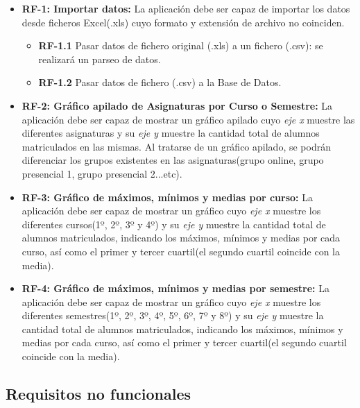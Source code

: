 \begin{itemize}
	\item \textbf{RF-1: Importar datos:} La aplicación debe ser capaz de importar los datos desde ficheros Excel(.xls) cuyo formato y extensión de archivo no coinciden.
	\begin{itemize}
		\item \textbf{RF-1.1} Pasar datos de fichero original (.xls) a un fichero (.csv): se realizará un parseo de datos.
		\item \textbf{RF-1.2} Pasar datos de fichero (.csv) a la Base de Datos.
	\end{itemize}
	
	\item \textbf{RF-2: Gráfico apilado de Asignaturas por Curso o Semestre:} La aplicación debe ser capaz de mostrar un gráfico apilado cuyo \emph{eje x} muestre las diferentes asignaturas y su \emph{eje y} muestre la cantidad total de alumnos matriculados en las mismas. Al tratarse de un gráfico apilado, se podrán diferenciar los grupos existentes en las asignaturas(grupo online, grupo presencial 1, grupo presencial 2...etc).
	
	\item \textbf{RF-3: Gráfico de máximos, mínimos y medias por curso:} La aplicación debe ser capaz de mostrar un gráfico cuyo \emph{eje x} muestre los diferentes cursos(1º, 2º, 3º y 4º) y su \emph{eje y} muestre la cantidad total de alumnos matriculados, indicando los máximos, mínimos y medias por cada curso, así como el primer y tercer cuartil(el segundo cuartil coincide con la media).

\item \textbf{RF-4: Gráfico de máximos, mínimos y medias por semestre:} La aplicación debe ser capaz de mostrar un gráfico cuyo \emph{eje x} muestre los diferentes semestres(1º, 2º, 3º, 4º, 5º, 6º, 7º y 8º) y su \emph{eje y} muestre la cantidad total de alumnos matriculados, indicando los máximos, mínimos y medias por cada curso, así como el primer y tercer cuartil(el segundo cuartil coincide con la media).

\end{itemize}


\subsection{Requisitos no funcionales}

